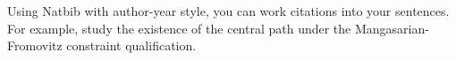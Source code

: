 \documentclass[runningheads,orivec,oribibl]{llncs}
\begin{document}
Using Natbib with author-year style, you can work citations into your sentences.
For example, \cite{wright-orban-2002} study the existence of the central path under the Mangasarian-Fromovitz constraint qualification.













\newpage

\hypertarget{contents}{}  %
\tableofcontents
\listoftodos
\end{document}
